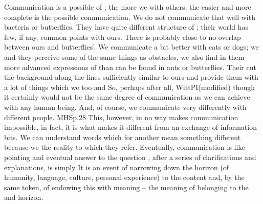 Communication is a possible   of ; the
more we  with others, the easier and more complete is the possible
communication.  We do not communicate that well with bacteria or butterflies.
They have quite different structure of ; their world has few, if
any, common points with ours.  There is probably close to no overlap between
ours and butterflies'.  We communicate a bit better with cats or dogs; we and
they perceive some of the same things as obstacles, we also find in them more
advanced expressions of  than can be found in ants or butterflies.
Their  {cut} the background along the lines sufficiently
similar to ours and provide them with a lot of things which we too
 and  So, perhaps after all, \citet{if a lion
  could speak, we might understand him,}{WittPI}{\hspace*{-.2em}(modified)} though it
certainly would not be the same degree of communication as we can achieve with
any human being. And, of course, we communicate very differently with different
people.  \citet{Each word means something slightly different to each person,
  even among those who share the same cultural background.}{MHS}{p.28}
This, however, in no way makes communication impossible, in fact, it is what
makes it different from an exchange of information bits.  We can understand
words which for another mean something different because we  the
reality to which they refer. Eventually, communication is like pointing and
eventual answer to the question , after a series of
clarifications and explanations, is simply  It is an event of narrowing down the  horizon
(of humanity, language, culture, personal experience) to the  content and, by
the same token, of endowing this  with meaning -- the meaning of
belonging to the  and  horizon.


